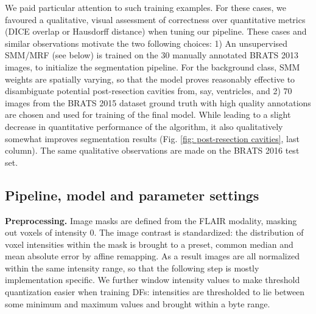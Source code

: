 We paid particular attention to such training examples. For these cases, we favoured a qualitative, visual 
assessment of correctness over quantitative metrics (DICE overlap or Hausdorff distance) when tuning our pipeline. 
These cases and similar observations motivate the two following choices: 1) An unsupervised SMM/MRF (see below) is trained on the $30$ manually annotated BRATS 2013 images, to initialize the segmentation pipeline. For the background class, SMM weights are spatially varying, so that the model proves reasonably effective to disambiguate potential post-resection cavities from, say, ventricles, and 2) $70$ images from the BRATS 2015 dataset ground truth with high quality annotations are chosen and used for training of the final model. While leading to a slight decrease in quantitative performance of the algorithm, it also qualitatively somewhat improves segmentation results (Fig. \ref{fig: post-resection cavities}, last column). The same qualitative observations are made on the BRATS 2016 test set. 

\subsection{Pipeline, model and parameter settings}

\noindent
\textbf{Preprocessing.} Image masks are defined from the FLAIR modality, masking out voxels of intensity $0$. The image contrast is standardized: the distribution of voxel intensities within the mask is brought to a preset, common median and mean absolute error by affine remapping. As a result images are all normalized within the same intensity range, so that the following step is mostly implementation specific. We further window intensity values to make threshold quantization easier when training DFs: intensities are thresholded to lie between some minimum and maximum values and brought within a byte range.\\

